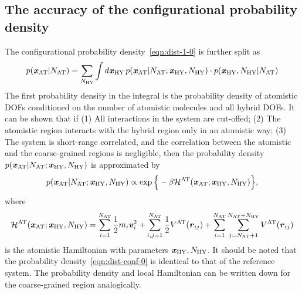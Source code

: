 \documentclass[epjST]{svjour}
\newcommand{\vect}[1]{\textbf{\textit{#1}}}
\newcommand{\mh}[0]{\mathcal {H}}
\newcommand{\AT}[0]{\textrm{AT}}
\newcommand{\HY}[0]{\textrm{HY}}
\begin{document}
\subsection{The accuracy of the configurational probability density}
The configurational probability density~\eqref{eqn:dist-1-0} is further split as
\begin{align}\label{eqn:conf-split}
  p(\vect x_\AT \vert N_\AT) =
  \sum_{N_\HY} \int {d}\vect x_\HY\,
  p(\vect x_\AT \vert N_\AT; \vect x_\HY, N_\HY)\cdot
  p(\vect x_\HY, N_\HY\vert N_\AT)  
\end{align}
The first probability density in the integral is the probability density
of atomistic DOFs conditioned on the number of atomistic molecules and all
hybrid DOFs.
It can be shown that if
(1) All interactions in the system are cut-offed;
(2) The atomistic region interacts with the hybrid region only in an atomistic way;
(3) The system is short-range correlated, and the correlation between the atomistic
and the coarse-grained regions is negligible, then the probability density $p(\vect x_\AT \vert N_\AT; \vect x_\HY, N_\HY)$
is approximated by
\begin{align}\label{eqn:dist-conf-0}
  p(\vect x_\AT \vert N_\AT; \vect x_\HY, N_\HY)
  \propto
  \exp\Big\{-\beta \mh^\AT(\vect x_\AT; \vect x_\HY, N_\HY) \Big\},
\end{align}
where 
\begin{align}
  \mh^\AT(\vect x_\AT; \vect x_\HY, N_\HY)
  =
  \sum_{i=1}^{N_\AT}\frac12 m_i\vect v_i^2 +
  \sum_{i,j=1}^{N_\AT} \frac12 V^\AT(\vect r_{ij}) +
  \sum_{i=1}^{N_\AT}\sum_{j=N_\AT+1}^{N_\AT + N_\HY} V^\AT(\vect r_{ij})
\end{align}
is the atomistic Hamiltonian with parameters $\vect x_\HY, N_\HY$. It
should be noted that the probability density~\eqref{eqn:dist-conf-0}
is identical to that of the reference system.
The probability density and local Hamiltonian
can be written down for the coarse-grained region analogically.
\end{document}
